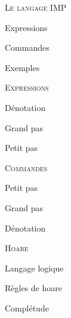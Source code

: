 \documentclass{article}
\begin{document}
\begin{multicols}{3}
    \begin{compactenum}[I.]
        \item \textsc{Le langage IMP}
            \begin{compactenum}[A)]
                \item Expressions 
                \item Commandes
                \item Exemples 
            \end{compactenum}
        \columnbreak
        \item \textsc{Expressions}
            \begin{compactenum}[A)]
                \item Dénotation
                \item Grand pas
                \item Petit pas
            \end{compactenum}
        \item \textsc{Commandes}
            \begin{compactenum}[A)]
                \item Petit pas
                \item Grand pas
                \item Dénotation
            \end{compactenum}
        \columnbreak
        \item \textsc{Hoare}
            \begin{compactenum}[A)]
                \item Langage logique
                \item Règles de hoare
                \item Complétude
            \end{compactenum}
    \end{compactenum}
\end{multicols}

\secquestionsclassiques
\end{document}
